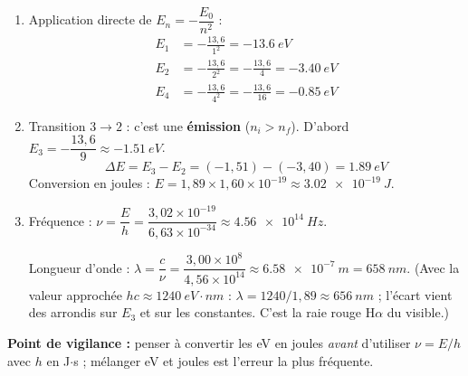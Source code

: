 \documentclass[11pt]{article}
\begin{document}
\begin{corrige}
\begin{enumerate}
\item Application directe de $E_n = -\dfrac{E_0}{n^2}$ :
\begin{align*}
E_1 &= -\frac{13,6}{1^2} = \SI{-13,6}{eV} \\
E_2 &= -\frac{13,6}{2^2} = -\frac{13,6}{4} = \SI{-3,40}{eV} \\
E_4 &= -\frac{13,6}{4^2} = -\frac{13,6}{16} = \SI{-0,85}{eV}
\end{align*}
\item Transition $3 \to 2$ : c'est une \textbf{émission} ($n_i > n_f$). D'abord $E_3 = -\dfrac{13,6}{9} \approx \SI{-1,51}{eV}$.
\[
\Delta E = E_3 - E_2 = (-1,51) - (-3,40) = \SI{1,89}{eV}
\]
Conversion en joules : $E = 1,89 \times 1,60\times 10^{-19} \approx \SI{3,02e-19}{J}$.
\item Fréquence : $\nu = \dfrac{E}{h} = \dfrac{3,02\times 10^{-19}}{6,63\times 10^{-34}} \approx \SI{4,56e14}{Hz}$.

Longueur d'onde : $\lambda = \dfrac{c}{\nu} = \dfrac{3,00\times 10^{8}}{4,56\times 10^{14}} \approx \SI{6,58e-7}{m} = \SI{658}{nm}$.
(Avec la valeur approchée $hc \approx \SI{1240}{eV\cdot nm}$ : $\lambda = 1240/1,89 \approx \SI{656}{nm}$ ; l'écart vient des arrondis sur $E_3$ et sur les constantes. C'est la raie rouge H$\alpha$ du visible.)
\end{enumerate}
\textbf{Point de vigilance :} penser à convertir les eV en joules \emph{avant} d'utiliser $\nu = E/h$ avec $h$ en J$\cdot$s ; mélanger eV et joules est l'erreur la plus fréquente.
\end{corrige}
\end{document}
